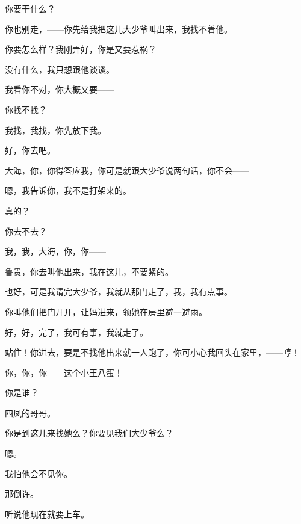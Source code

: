 你要干什么？

你也别走，——你先给我把这儿大少爷叫出来，我找不着他。

你要怎么样？我刚弄好，你是又要惹祸？

没有什么，我只想跟他谈谈。

我看你不对，你大概又要——

你找不找？

我找，我找，你先放下我。

好，你去吧。

大海，你，你得答应我，你可是就跟大少爷说两句话，你不会——

嗯，我告诉你，我不是打架来的。

真的？

你去不去？

我，我，大海，你，你——

鲁贵，你去叫他出来，我在这儿，不要紧的。

也好，可是我请完大少爷，我就从那门走了，我，我有点事。

你叫他们把门开开，让妈进来，领她在房里避一避雨。

好，好，完了，我可有事，我就走了。

站住！你进去，要是不找他出来就一人跑了，你可小心我回头在家里，——哼！

你，你，你——这个小王八蛋！

你是谁？

四凤的哥哥。

你是到这儿来找她么？你要见我们大少爷么？

嗯。

我怕他会不见你。

那倒许。

听说他现在就要上车。

